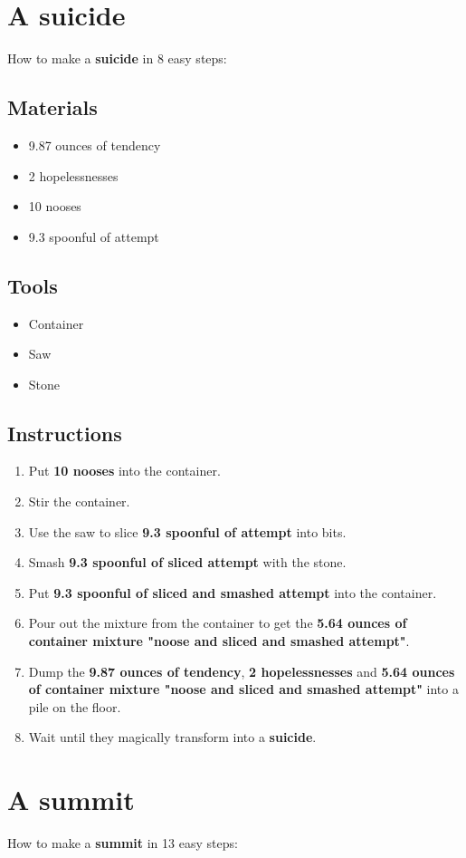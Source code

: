 \documentclass{article}
\begin{document}
\section{A suicide}How to make a \textbf{suicide} in 8 easy steps:

\subsection{Materials}\begin{itemize}
\item 
9.87 ounces of tendency
\item 
2 hopelessnesses
\item 
10 nooses
\item 
9.3 spoonful of attempt
\end{itemize}
\subsection{Tools}\begin{itemize}
\item 
Container
\item 
Saw
\item 
Stone
\end{itemize}
\subsection{Instructions}\begin{enumerate}
\item 
Put \textbf{10 nooses} into the container.
\item 
Stir the container.
\item 
Use the saw to slice \textbf{9.3 spoonful of attempt} into bits.
\item 
Smash \textbf{9.3 spoonful of sliced attempt} with the stone.
\item 
Put \textbf{9.3 spoonful of sliced and smashed attempt} into the container.
\item 
Pour out the mixture from the container to get the \textbf{5.64 ounces of container mixture "noose and sliced and smashed attempt"}.
\item 
Dump the \textbf{9.87 ounces of tendency}, \textbf{2 hopelessnesses} and \textbf{5.64 ounces of container mixture "noose and sliced and smashed attempt"} into a pile on the floor.
\item 
Wait until they magically transform into a \textbf{suicide}.
\end{enumerate}
\newpage
\section{A summit}How to make a \textbf{summit} in 13 easy steps:
\end{document}
